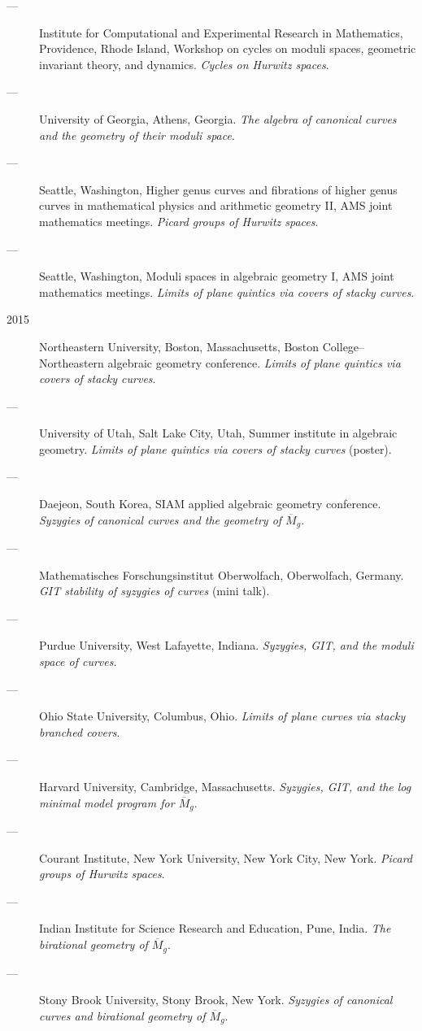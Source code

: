 \documentclass[11pt]{article}
\begin{document}
\begin{description}
\item[{---}] Institute for Computational and Experimental Research in Mathematics, Providence, Rhode Island, Workshop on cycles on moduli spaces, geometric invariant theory, and dynamics. \emph{Cycles on Hurwitz spaces}.
\item[{---}] University of Georgia, Athens, Georgia. \emph{The algebra of canonical curves and the geometry of their moduli space}.
\item[{---}] Seattle, Washington, Higher genus curves and fibrations of higher genus curves in mathematical physics and arithmetic geometry II, AMS joint mathematics meetings. \emph{Picard groups of Hurwitz spaces}.
\item[{---}] Seattle, Washington, Moduli spaces in algebraic geometry I, AMS joint mathematics meetings. \emph{Limits of plane quintics via covers of stacky curves}.
\item[{2015}] Northeastern University, Boston, Massachusetts, Boston College--Northeastern algebraic geometry conference. \emph{Limits of plane quintics via covers of stacky curves}.
\item[{---}] University of Utah, Salt Lake City, Utah, Summer institute in algebraic geometry. \emph{Limits of plane quintics via covers of stacky curves} (poster).
\item[{---}] Daejeon, South Korea, SIAM applied algebraic geometry conference. \emph{Syzygies of canonical curves and the geometry of \(\overline M_g\)}.
\item[{---}] Mathematisches Forschungsinstitut Oberwolfach, Oberwolfach, Germany. \emph{GIT stability of syzygies of curves} (mini talk).
\item[{---}] Purdue University, West Lafayette, Indiana. \emph{Syzygies, GIT, and the moduli space of curves}.
\item[{---}] Ohio State University, Columbus, Ohio. \emph{Limits of plane curves via stacky branched covers}.
\item[{---}] Harvard University, Cambridge, Massachusetts. \emph{Syzygies, GIT, and the log minimal model program for \(\overline{M}_g\)}.
\item[{---}] Courant Institute, New York University, New York City, New York. \emph{Picard groups of Hurwitz spaces}.
\item[{---}] Indian Institute for Science Research and Education, Pune, India. \emph{The birational geometry of \(\overline M_g\)}.
\item[{---}] Stony Brook University, Stony Brook, New York. \emph{Syzygies of canonical curves and birational geometry of \(\overline M_g\)}.

\end{description}
\end{document}
